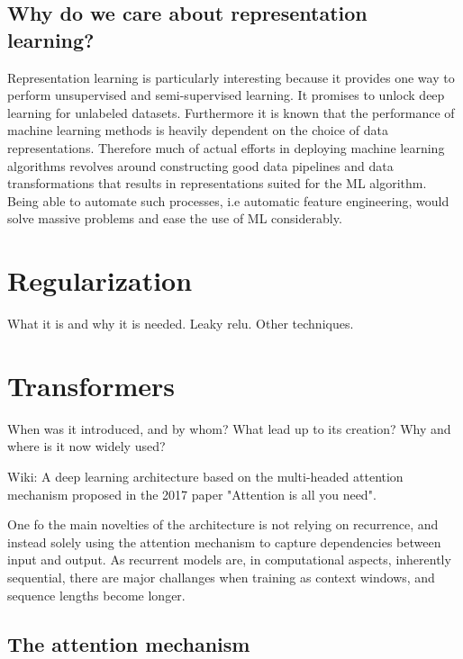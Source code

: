 \documentclass[../../thesis.tex]{subfiles}
\begin{document}
\subsection{Why do we care about representation learning?}

Representation learning is particularly interesting because it provides one way to perform unsupervised and semi-supervised learning. It promises to unlock deep learning for unlabeled datasets. Furthermore it is known that the performance of machine learning methods is heavily dependent on the choice of data representations. Therefore much of actual efforts in deploying machine learning algorithms revolves around constructing good data pipelines and data transformations that results in representations suited for the ML algorithm. Being able to automate such processes, i.e automatic feature engineering, would solve massive problems and ease the use of ML considerably. 


\section{Regularization}

What it is and why it is needed. Leaky relu. Other techniques.

\section{Transformers}

When was it introduced, and by whom?
What lead up to its creation?
Why and where is it now widely used? 


Wiki: A deep learning architecture based on the multi-headed attention mechanism proposed in the 2017 paper "Attention is all you need".

One fo the main novelties of the architecture is not relying on recurrence, and instead solely using the attention mechanism to capture dependencies between input and output. As recurrent models are, in computational aspects, inherently sequential, there are major challanges when training as context windows, and sequence lengths become longer. 



\subsection{The attention mechanism}
\end{document}
